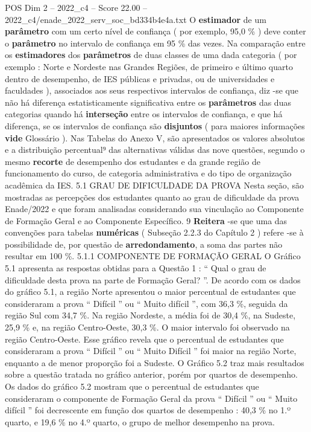 \begin{textsample}{POS Dim 2 – 2022\_c4 – Score 22.00 – 2022\_c4/enade\_2022\_serv\_soc\_bd334b4e4a.txt}
O \textbf{estimador} de um \textbf{parâmetro} com um certo nível de confiança ( por exemplo, 95,0 \% ) deve conter o \textbf{parâmetro} no intervalo de confiança em 95 \% das vezes.
Na comparação entre os \textbf{estimadores} dos \textbf{parâmetros} de duas classes de uma dada categoria ( por exemplo : Norte e Nordeste nas Grandes Regiões, de primeiro e último quarto dentro de desempenho, de IES públicas e privadas, ou de universidades e faculdades ), associados aos seus respectivos intervalos de confiança, diz -se que não há diferença estatisticamente significativa entre os \textbf{parâmetros} das duas categorias quando há \textbf{interseção} entre os intervalos de confiança, e que há diferença, se os intervalos de confiança são \textbf{disjuntos} ( para maiores informações \textbf{vide} Glossário ).
Nas Tabelas do Anexo V, são apresentados os valores absolutos e a distribuição percentual⁹ das alternativas válidas das nove questões, segundo o mesmo \textbf{recorte} de desempenho dos estudantes e da grande região de funcionamento do curso, de categoria administrativa e do tipo de organização acadêmica da IES. 5.1 GRAU DE DIFICULDADE DA PROVA Nesta seção, são mostradas as percepções dos estudantes quanto ao grau de dificuldade da prova Enade/2022 e que foram analisadas considerando sua vinculação ao Componente de Formação Geral e ao Componente Específico. 9 \textbf{Reitera} -se que uma das convenções para tabelas \textbf{numéricas} ( Subseção 2.2.3 do Capítulo 2 ) refere -se à possibilidade de, por questão de \textbf{arredondamento}, a soma das partes não resultar em 100 \%. 5.1.1 COMPONENTE DE FORMAÇÃO GERAL O Gráfico 5.1 apresenta as respostas obtidas para a Questão 1 : “ Qual o grau de dificuldade desta prova na parte de Formação Geral? ”.
De acordo com os dados do gráfico 5.1, a região Norte apresentou o maior percentual de estudantes que consideraram a prova “ Difícil ” ou “ Muito difícil ”, com 36,3 \%, seguida da região Sul com 34,7 \%.
Na região Nordeste, a média foi de 30,4 \%, na Sudeste, 25,9 \% e, na região Centro-Oeste, 30,3 \%.
O maior intervalo foi observado na região Centro-Oeste.
Esse gráfico revela que o percentual de estudantes que consideraram a prova “ Difícil ” ou “ Muito Difícil ” foi maior na região Norte, enquanto a de menor proporção foi a Sudeste.
O Gráfico 5.2 traz mais resultados sobre a questão tratada no gráfico anterior, porém por quartos de desempenho.
Os dados do gráfico 5.2 mostram que o percentual de estudantes que consideraram o componente de Formação Geral da prova “ Difícil ” ou “ Muito difícil ” foi decrescente em função dos quartos de desempenho : 40,3 \% no 1.º quarto, e 19,6 \% no 4.º quarto, o grupo de melhor desempenho na prova.

\end{textsample}
